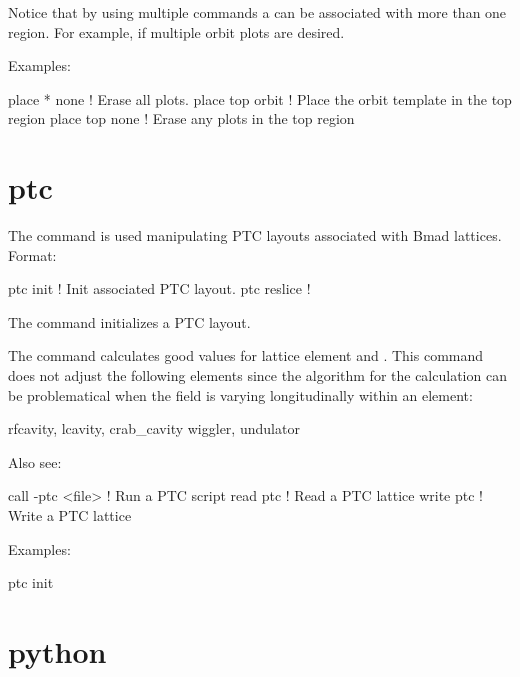 Notice that by using multiple  commands a  can be associated with more than
one region. For example, if multiple orbit plots are desired.

Examples:
\begin{example}
  place * none     ! Erase all plots.
  place top orbit  ! Place the orbit template in the top region
  place top none   ! Erase any plots in the top region
\end{example}

\section{ptc}
\label{s:ptc}

The  command is used manipulating PTC layouts associated with Bmad
lattices. Format:
\begin{example}
  ptc init            ! Init associated PTC layout.
  ptc reslice         !
\end{example}

\vskip 10pt 

The  command initializes a PTC layout.

The  command calculates good values for lattice element  and . This
command does not adjust the following elements since the algorithm for the calculation can be problematical when the field
is varying longitudinally within an element:
\begin{example}
  rfcavity, lcavity, crab_cavity
  wiggler, undulator
\end{example}

Also see:
\begin{example}
  call -ptc <file>         ! Run a PTC script
  read ptc                 ! Read a PTC lattice
  write ptc                ! Write a PTC lattice
\end{example}

Examples:
\begin{example}
  ptc init
\end{example}


\section{python}
\label{s:python}

